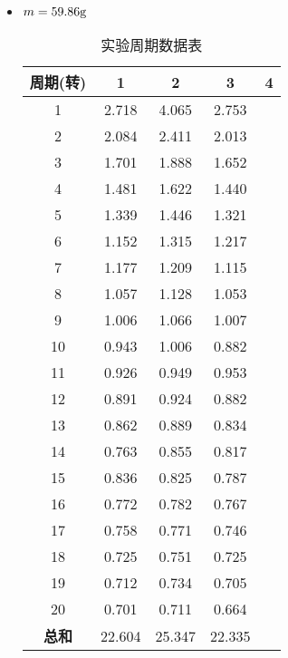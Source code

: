 \documentclass[12pt,hyperref,a4paper,UTF8]{ctexart}
\begin{document}
\begin{itemize}
            \item $m=59.86\text g$
                \begin{table}[h!]
                    \centering
                    \begin{tabular}{ccccc}
                    \toprule
                    \textbf{周期(转)} & \textbf{1} & \textbf{2} & \textbf{3} & \textbf{4} \\
                    \midrule
                    1  & 2.718 & 4.065 & 2.753 \\
                    2  & 2.084 & 2.411 & 2.013 \\
                    3  & 1.701 & 1.888 & 1.652 \\
                    4  & 1.481 & 1.622 & 1.440 \\
                    5  & 1.339 & 1.446 & 1.321 \\
                    6  & 1.152 & 1.315 & 1.217 \\
                    7  & 1.177 & 1.209 & 1.115 \\
                    8  & 1.057 & 1.128 & 1.053 \\
                    9  & 1.006 & 1.066 & 1.007 \\
                    10 & 0.943 & 1.006 & 0.882 \\
                    11 & 0.926 & 0.949 & 0.953 \\
                    12 & 0.891 & 0.924 & 0.882 \\
                    13 & 0.862 & 0.889 & 0.834 \\
                    14 & 0.763 & 0.855 & 0.817 \\
                    15 & 0.836 & 0.825 & 0.787 \\
                    16 & 0.772 & 0.782 & 0.767 \\
                    17 & 0.758 & 0.771 & 0.746 \\
                    18 & 0.725 & 0.751 & 0.725 \\
                    19 & 0.712 & 0.734 & 0.705 \\
                    20 & 0.701 & 0.711 & 0.664 \\
                    \midrule
                    \textbf{总和} & 22.604 & 25.347 & 22.335 \\
                    \bottomrule
                    \end{tabular}
                    \caption{实验周期数据表}
                    \end{table}
                    


\end{itemize}
\end{document}

